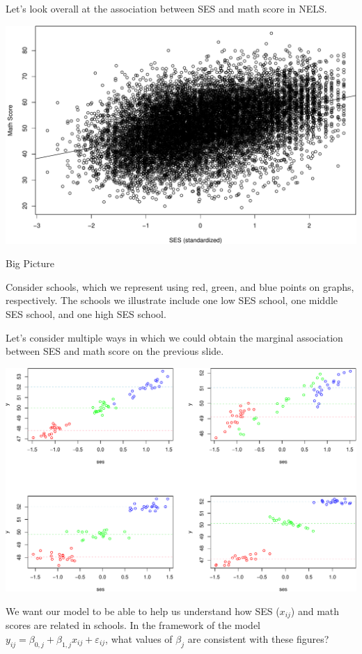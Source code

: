 \documentclass[ignorenonframetext,]{beamer}
\begin{document}
\begin{frame}{}

Let's look overall at the association between SES and math score in
NELS.

\includegraphics[width=0.8\linewidth]{ancova_01_deck_files/figure-beamer/scatter-1}

\end{frame}

\begin{frame}{Big Picture}

Consider schools, which we represent using red, green, and blue points
on graphs, respectively. The schools we illustrate include one low SES
school, one middle SES school, and one high SES school.

Let's consider multiple ways in which we could obtain the marginal
association between SES and math score on the previous slide.

\end{frame}

\begin{frame}{}

\includegraphics[width=0.6\linewidth]{ancova_01_deck_files/figure-beamer/illustrateplot-1}

We want our model to be able to help us understand how SES (\(x_{ij}\))
and math scores are related in schools. In the framework of the model
\(y_{ij}=\beta_{0,j}+\beta_{1,j}x_{ij} + \varepsilon_{ij}\), what values
of \(\beta_{j}\) are consistent with these figures?

\end{frame}
\end{document}

